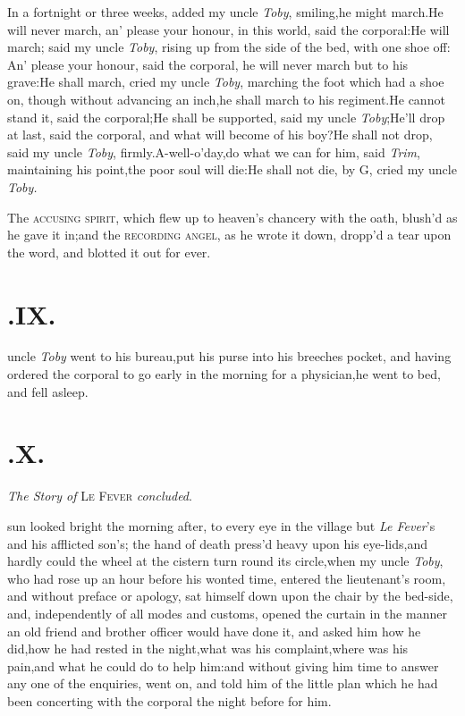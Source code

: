 \documentclass{article}
\begin{document}
\tsh In a fortnight or three weeks, added my uncle
\textit{Toby}, smiling,\tsh he might march.\tsh He
will never march, an’ please your honour, in this world, said
the corporal:\tsh He will march; said my uncle
\textit{Toby}, rising up from the side of the bed, with one shoe
off:\tsh\break
An’ please your honour, said the corporal,
he will never march but to his grave:\tsh He shall march,
cried my uncle \textit{Toby}, marching the foot which had a shoe on,
though without advancing an inch,\tsk he shall march to his
regiment.\tsh He cannot stand it, said the
corporal;\tsh He shall be supported, said my uncle
\textit{Toby};\tsh He’ll drop at last, said the
corporal, and what will become of his boy?\tsh He shall
not drop, said my uncle \textit{Toby},
firmly.\tsh A-well-o’day,\break\tsk do what we can for
him, said \textit{Trim}, maintaining his point,\tsk the poor soul
will die:\tsh He shall not die, by G\tsk , cried my
uncle \textit{Toby.}

\tsk The \textsc{accusing spirit}, which flew up to
heaven’s chancery with the oath, blush’d as he gave it
in;\tsk and the \textsc{recording angel}, as he wrote it
down, dropp’d a tear upon the word, and blotted it out for
ever.

\section{.\enspace IX.}

 uncle \textit{Toby}
went to his bureau,\tsk put his purse into his breeches pocket,
and having ordered the corporal to go early in the morning for a
physician,\tsk he went to bed, and fell asleep.

\vfill{}\eject
\null\par
\section{.\enspace X.}

\smallskip
\centerline{\textit{The Story of} \textsc{Le Fever} \textit{concluded}.}

 sun looked bright the morning
after, to every eye in the village but \textit{Le Fever}’s and
his afflicted son’s; the hand of death press’d heavy upon his
eye-lids,\tsh and hardly could the wheel at the cistern
turn round its circle,\break\tsk when my uncle \textit{Toby}, who had
rose up an hour before his wonted time, entered the
lieutenant’s room, and without preface or apology, sat
himself down upon the chair by the bed-side, and, independently of
all modes and customs, opened the curtain in the manner an old
friend and brother officer would have done it, and asked him how he
did,\tsk how he had rested in the night,\tsk what was his
complaint,\tsk where was his pain,\tsk and what he could do to
help him:\tsh and without giving him time to answer any
one of the enquiries, went on, and told him of the little plan
which he had been concerting with the corporal the night
before for him.\tsh
\end{document}
